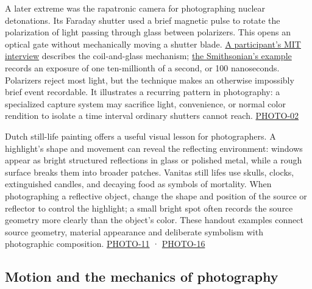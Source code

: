 A later extreme was the rapatronic camera for photographing nuclear detonations. Its Faraday shutter used a brief magnetic pulse to rotate the polarization of light passing through glass between polarizers. This opens an optical gate without mechanically moving a shutter blade. \href{https://infinite.mit.edu/video/charles-wyckoff-working-doc\%E2\%80\%99-edgerton-1995-interview/}{A participant's MIT interview} describes the coil-and-glass mechanism; \href{https://americanhistory.si.edu/collections/object/nmah_1393360}{the Smithsonian's example} records an exposure of one ten-millionth of a second, or 100 nanoseconds. Polarizers reject most light, but the technique makes an otherwise impossibly brief event recordable. It illustrates a recurring pattern in photography: a specialized capture system may sacrifice light, convenience, or normal color rendition to isolate a time interval ordinary shutters cannot reach. \hyperref[04-visual-computing-ii-ch036-photo-02---photography-session-02]{PHOTO-02}

Dutch still-life painting offers a useful visual lesson for photographers. A highlight's shape and movement can reveal the reflecting environment: windows appear as bright structured reflections in glass or polished metal, while a rough surface breaks them into broader patches. Vanitas still lifes use skulls, clocks, extinguished candles, and decaying food as symbols of mortality. When photographing a reflective object, change the shape and position of the source or reflector to control the highlight; a small bright spot often records the source geometry more clearly than the object's color. These handout examples connect source geometry, material appearance and deliberate symbolism with photographic composition. \hyperref[04-visual-computing-ii-ch036-photo-11---photography-session-11]{PHOTO-11} · \hyperref[04-visual-computing-ii-ch036-photo-16---photography-session-16]{PHOTO-16}

\subsection{Motion and the mechanics of photography}\label{04-visual-computing-ii-ch034-motion-and-the-mechanics-of-photography}

\hypertarget{04-visual-computing-ii-ch034-motion-and-the-mechanics-of-photography}{}

